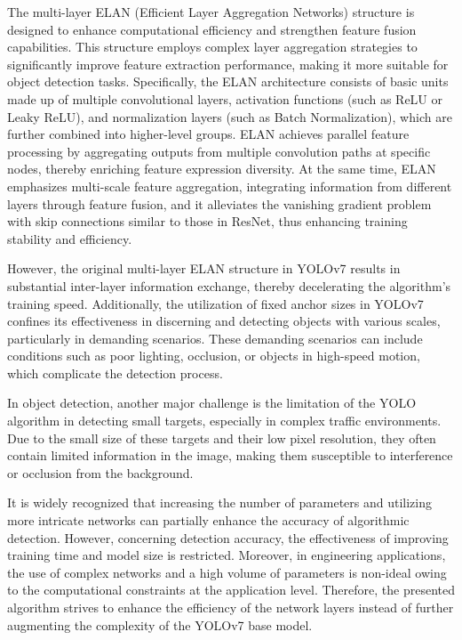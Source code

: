 \documentclass[aic]{iosart2x}
\begin{document}
The multi-layer ELAN (Efficient Layer Aggregation Networks) structure is designed to enhance computational efficiency and strengthen feature fusion capabilities. This structure employs complex layer aggregation strategies to significantly improve feature extraction performance, making it more suitable for object detection tasks. Specifically, the ELAN architecture consists of basic units made up of multiple convolutional layers, activation functions (such as ReLU or Leaky ReLU), and normalization layers (such as Batch Normalization), which are further combined into higher-level groups. ELAN achieves parallel feature processing by aggregating outputs from multiple convolution paths at specific nodes, thereby enriching feature expression diversity. At the same time, ELAN emphasizes multi-scale feature aggregation, integrating information from different layers through feature fusion, and it alleviates the vanishing gradient problem with skip connections similar to those in ResNet, thus enhancing training stability and efficiency.

However, the original multi-layer ELAN structure in YOLOv7 results in substantial inter-layer information exchange, thereby decelerating the algorithm's training speed. Additionally, the utilization of fixed anchor sizes in YOLOv7 confines its effectiveness in discerning and detecting objects with various scales, particularly in demanding scenarios. These demanding scenarios can include conditions such as poor lighting, occlusion, or objects in high-speed motion, which complicate the detection process.

In object detection, another major challenge is the limitation of the YOLO algorithm in detecting small targets, especially in complex traffic environments. Due to the small size of these targets and their low pixel resolution, they often contain limited information in the image, making them susceptible to interference or occlusion from the background.

It is widely recognized that increasing the number of parameters and utilizing more intricate networks can partially enhance the accuracy of algorithmic detection. However, concerning detection accuracy, the effectiveness of improving training time and model size is restricted. Moreover, in engineering applications, the use of complex networks and a high volume of parameters is non-ideal owing to the computational constraints at the application level. Therefore, the presented algorithm strives to enhance the efficiency of the network layers instead of further augmenting the complexity of the YOLOv7 base model.
\end{document}
